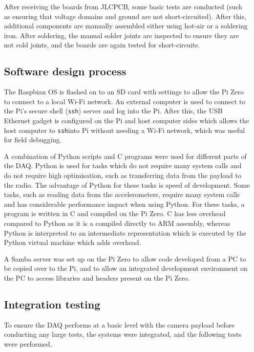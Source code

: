 \documentclass{report}
\newcommand{\ssh}{\texttt{ssh}}
\begin{document}
After receiving the boards from JLCPCB, some basic tests are conducted (such as ensuring that voltage domains and ground are not short-circuited). After this, additional components are manually assembled either using hot-air or a soldering iron. After soldering, the manual solder joints are inspected to ensure they are not cold joints, and the boards are again tested for short-circuits.

\subsection{Software design process}

The Raspbian OS is flashed on to an SD card with settings to allow the Pi Zero to connect to a local Wi-Fi network. An external computer is used to connect to the Pi's secure shell (\ssh) server and log into the Pi. After this, the USB Ethernet gadget is configured on the Pi and host computer sides which allows the host computer to \ssh into Pi without needing a Wi-Fi network, which was useful for field debugging.

A combination of Python scripts and C programs were used for different parts of the DAQ. Python is used for tasks which do not require many system calls and do not require high optimisation, such as transferring data from the payload to the radio. The advantage of Python for these tasks is speed of development.  Some tasks, such as reading data from the accelerometers, require many system calls and has considerable performance impact when using Python. For these tasks, a program is written in C and compiled on the Pi Zero. C has less overhead compared to Python as it is a compiled directly to ARM assembly, whereas Python is interpreted to an intermediate representation which is executed by the Python virtual machine which adds overhead.

A Samba server was set up on the Pi Zero to allow code developed from a PC to be copied over to the Pi, and to allow an integrated development environment on the PC to access libraries and headers present on the Pi Zero.

\subsection{Integration testing}

To ensure the DAQ performs at a basic level with the camera payload before conducting any large tests, the systems were integrated, and the following tests were performed.
\end{document}
